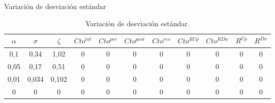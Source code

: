 \begin{frame}{Variación de desviación estándar}
\footnotesize
    \begin{table}[H]
		\renewcommand{\arraystretch}{1.3}
		\centering
		\caption{Variación de desviación estándar.}
		\label{tab:comp_sigma}
		\begin{tabular}{|c|c|c|c|c|c|c|c|c|c|c|}
			\hline 
			$\alpha$ & $\sigma$ & $\zeta$ & $Cto^{tot}$& $Cto^{pre}$ & $Cto^{post}$ & $Cto^{res}$ & $Cto^{RUp}$ & $Cto^{RDn}$ & $R^{Up}$ & $R^{Dn}$\\
			\hline
			0,1  &  0,34  & 1,02  & 0 & 0 & 0 & 0 & 0 & 0 & 0 & 0\\
			0,05 &  0,17  & 0,51  & 0 & 0 & 0 & 0 & 0 & 0 & 0 & 0\\
			0,01 &  0,034 & 0,102 & 0 & 0 & 0 & 0 & 0 & 0 & 0 & 0\\
			0    &  0     & 0     & 0 & 0 & 0 & 0 & 0 & 0 & 0 & 0\\
			\hline
		\end{tabular}
	\end{table}
\end{frame}

